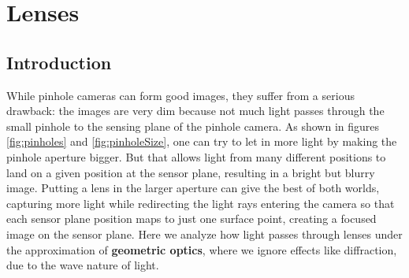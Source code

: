 \chapter{Lenses}
\label{chapter:lenses}



\section{Introduction}

While pinhole cameras can form good images, they suffer from a serious drawback:  the images are very dim because not much light passes through the small pinhole to the sensing plane of the pinhole camera. As shown in figures \ref{fig:pinholes} and \ref{fig:pinholeSize}, one can try to let in more light by making the pinhole aperture bigger.  But that allows light from many different positions to land on a given position at the sensor plane, resulting in a bright but blurry image.  Putting a lens in the larger aperture can give the best of both worlds,  capturing more light while redirecting the light rays entering the camera so that each sensor plane position maps to just one surface point, creating a focused image on the sensor plane.  Here we analyze how light passes through lenses under the approximation of {\bf geometric optics}, where we ignore effects like diffraction, due to the wave nature of light.



